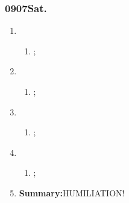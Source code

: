 \subsubsection{0907Sat.}
\begin{enumerate}
	\item \ncquaone
	\begin{enumerate}[(1)]
		\item ;\rightundoneBlack
	\end{enumerate}
	
	\item \ncquatwo	
	\begin{enumerate}[(1)]
		\item ;\rightundoneBlack
	\end{enumerate}
	
	\item \ncquathree
	\begin{enumerate}[(1)]
		\item ;\rightundoneBlack
	\end{enumerate}
	
	\item \ncquafour	
	\begin{enumerate}[(1)]
		\item ;\rightundoneBlack
	\end{enumerate}
	\item \textbf{Summary:}HUMILIATION! 
\end{enumerate}
